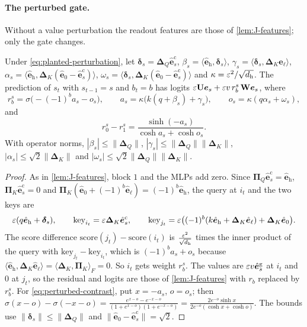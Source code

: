 \paragraph{The perturbed gate.} Without a value perturbation the readout features are those of \cref{lem:J-features};
only the gate changes.

\begin{lemma}
\label{lem:perturbed-gate}
Under \cref{eq:planted-perturbation}, let $\bm\delta_s=\bm\Delta_Q\hat{\bm e}^{\mathrm c}_s$, $\beta_s=\langle\hat{\bm e}_{\mathrm h},\bm\delta_s\rangle$,
$\gamma_s=\langle\bm\delta_s,\bm\Delta_K\hat{\bm e}_\ell\rangle$, $\alpha_s=\langle\hat{\bm e}_{\mathrm h},\bm\Delta_K(\hat{\bm e}_0-\hat{\bm e}^{\mathrm c}_s)\rangle$,
$\omega_s=\langle\bm\delta_s,\bm\Delta_K(\hat{\bm e}_0-\hat{\bm e}^{\mathrm c}_s)\rangle$ and $\kappa=\varepsilon^2/\sqrt{d_{\mathrm h}}$. The prediction of $s_t$ with
$s_{t-1}=s$ and $b_t=b$ has logits $\varepsilon\mathbf U\bm e_s+\varepsilon v\,r^s_b\,\mathbf W\bm e_s$, where
\begin{equation}
 r^s_b=\sigma\bigl(-(-1)^ba_s-o_s\bigr),\qquad a_s=\kappa\bigl(k(q+\beta_s)+\gamma_s\bigr),\qquad o_s=\kappa(q\alpha_s+\omega_s),
 \label{eq:perturbed-gate}
\end{equation}
and
\begin{equation}
 r^s_0-r^s_1=\frac{\sinh(-a_s)}{\cosh a_s+\cosh o_s}.
 \label{eq:perturbed-contrast}
\end{equation}
With operator norms, $|\beta_s|\le\|\bm\Delta_Q\|$, $|\gamma_s|\le\|\bm\Delta_Q\|\|\bm\Delta_K\|$, $|\alpha_s|\le\sqrt2\|\bm\Delta_K\|$ and
$|\omega_s|\le\sqrt2\|\bm\Delta_Q\|\|\bm\Delta_K\|$.
\end{lemma}

\begin{proof}
As in \cref{lem:J-features}, block $1$ and the MLPs add zero. Since $\bm\Pi_Q\hat{\bm e}^{\mathrm c}_s=\hat{\bm e}_{\mathrm h}$,
$\bm\Pi_K\hat{\bm e}^{\mathrm c}_s=0$ and $\bm\Pi_K(\hat{\bm e}_0+(-1)^b\hat{\bm e}_\ell)=(-1)^b\hat{\bm e}_{\mathrm h}$, the query at $i_t$ and the
two keys are
\[
 \varepsilon(q\hat{\bm e}_{\mathrm h}+\bm\delta_s),\qquad \mathrm{key}_{i_t}=\varepsilon\bm\Delta_K\hat{\bm e}^{\mathrm c}_s,\qquad
 \mathrm{key}_{j_t}=\varepsilon\bigl((-1)^b(k\hat{\bm e}_{\mathrm h}+\bm\Delta_K\hat{\bm e}_\ell)+\bm\Delta_K\hat{\bm e}_0\bigr).
\]
The score difference $\mathrm{score}(j_t)-\mathrm{score}(i_t)$ is $\frac{\varepsilon^2}{\sqrt{d_{\mathrm h}}}$ times the inner product of the query with
$\mathrm{key}_{j_t}-\mathrm{key}_{i_t}$, which is $(-1)^ba_s+o_s$ because $\langle\hat{\bm e}_{\mathrm h},\bm\Delta_K\hat{\bm e}_\ell\rangle=\langle\bm\Delta_K,\bm\Pi_K\rangle_F=0$.
So $i_t$ gets weight $r^s_b$. The values are $\varepsilon v\hat{\bm e}^{\mathrm g}_s$ at $i_t$ and $0$ at $j_t$, so the residual and logits are those of
\cref{lem:J-features} with $r_b$ replaced by $r^s_b$. For \cref{eq:perturbed-contrast}, put $x=-a_s$, $o=o_s$; then
$\sigma(x-o)-\sigma(-x-o)=\frac{e^{x-o}-e^{-x-o}}{(1+e^{x-o})(1+e^{-x-o})}=\frac{2e^{-o}\sinh x}{2e^{-o}(\cosh x+\cosh o)}$. The bounds use
$\|\bm\delta_s\|\le\|\bm\Delta_Q\|$ and $\|\hat{\bm e}_0-\hat{\bm e}^{\mathrm c}_s\|=\sqrt2$.
\end{proof}

